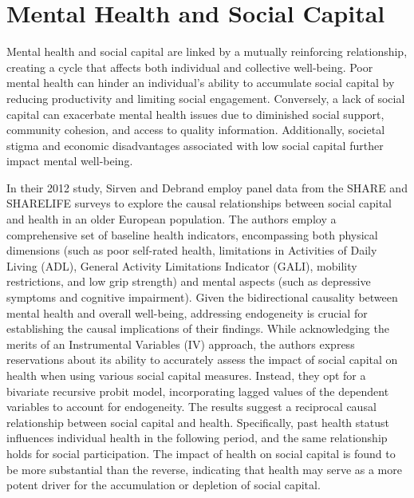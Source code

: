 \section{Mental Health and Social Capital}
    Mental health and social capital are linked by a mutually reinforcing relationship, creating a cycle that affects both individual and collective well-being. Poor mental health can hinder an individual's ability to accumulate social capital by reducing productivity and limiting social engagement. Conversely, a lack of social capital can exacerbate mental health issues due to diminished social support, community cohesion, and access to quality information. Additionally, societal stigma and economic disadvantages associated with low social capital further impact mental well-being.

    In their 2012 study, Sirven and Debrand employ panel data from the SHARE and SHARELIFE surveys to explore the causal relationships between social capital and health in an older European population. The authors employ a comprehensive set of baseline health indicators, encompassing both physical dimensions (such as poor self-rated health, limitations in Activities of Daily Living (ADL), General Activity Limitations Indicator (GALI), mobility restrictions, and low grip strength) and mental aspects (such as depressive symptoms and cognitive impairment). Given the bidirectional causality between mental health and overall well-being, addressing endogeneity is crucial for establishing the causal implications of their findings. While acknowledging the merits of an Instrumental Variables (IV) approach, the authors express reservations about its ability to accurately assess the impact of social capital on health when using various social capital measures. Instead, they opt for a bivariate recursive probit model, incorporating lagged values of the dependent variables to account for endogeneity.
    The results suggest a reciprocal causal relationship between social capital and health. Specifically, past health statust influences individual health in the following period, and the same relationship holds for social participation. The impact of health on social capital is found to be more substantial than the reverse, indicating that health may serve as a more potent driver for the accumulation or depletion of social capital. 

